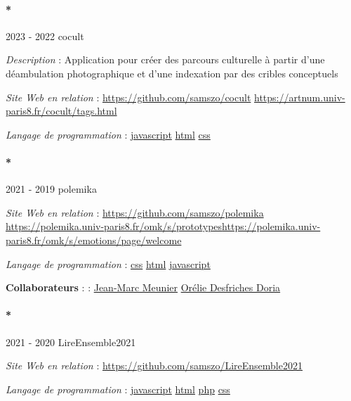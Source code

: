 \documentclass[
  a4paper,
  DIV=11,
  numbers=noendperiod]{scrreprt}
\let\oldparagraph\paragraph
\renewcommand{\paragraph}[1]{\oldparagraph{#1}\mbox{}}
\begin{document}
\paragraph*{2023 - 2022 cocult}\label{sec-item299711}

\emph{Description} : Application pour créer des parcours culturelle à
partir d'une déambulation photographique et d'une indexation par des
cribles conceptuels

\emph{Site Web en relation} : \url{https://github.com/samszo/cocult}
\url{https://artnum.univ-paris8.fr/cocult/tags.html}

\emph{Langage de programmation} :
\href{http://localhost/samszo/omk/s/fiches/item/89711}{javascript}
\href{http://localhost/samszo/omk/s/fiches/item/96621}{html}
\href{http://localhost/samszo/omk/s/fiches/item/102418}{css}

\paragraph*{2021 - 2019 polemika}\label{sec-item301846}

\emph{Site Web en relation} : \url{https://github.com/samszo/polemika}
\url{https://polemika.univ-paris8.fr/omk/s/prototypes}\url{https://polemika.univ-paris8.fr/omk/s/emotions/page/welcome}

\emph{Langage de programmation} :
\href{http://localhost/samszo/omk/s/fiches/item/102418}{css}
\href{http://localhost/samszo/omk/s/fiches/item/96621}{html}
\href{http://localhost/samszo/omk/s/fiches/item/89711}{javascript}

\textbf{Collaborateurs} : :
\href{http://localhost/samszo/omk/s/fiches/item/62155}{Jean-Marc
Meunier} \href{http://localhost/samszo/omk/s/fiches/item/62137}{Orélie
Desfriches Doria}

\paragraph*{2021 - 2020 LireEnsemble2021}\label{sec-item301821}

\emph{Site Web en relation} :
\url{https://github.com/samszo/LireEnsemble2021}

\emph{Langage de programmation} :
\href{http://localhost/samszo/omk/s/fiches/item/89711}{javascript}
\href{http://localhost/samszo/omk/s/fiches/item/96621}{html}
\href{http://localhost/samszo/omk/s/fiches/item/108369}{php}
\href{http://localhost/samszo/omk/s/fiches/item/102418}{css}
\end{document}
